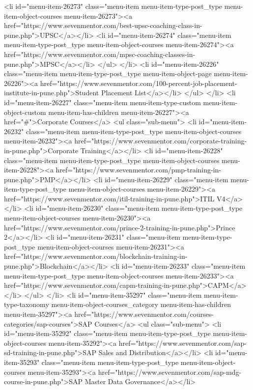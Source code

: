 {<li id="menu-item-26273" class="menu-item menu-item-type-post_type menu-item-object-courses menu-item-26273"><a href="https://www.sevenmentor.com/best-upsc-coaching-class-in-pune.php">UPSC</a></li>
<li id="menu-item-26274" class="menu-item menu-item-type-post_type menu-item-object-courses menu-item-26274"><a href="https://www.sevenmentor.com/mpsc-coaching-classes-in-pune.php">MPSC</a></li>
</ul>
</li>
<li id="menu-item-26226" class="menu-item menu-item-type-post_type menu-item-object-page menu-item-26226"><a href="https://www.sevenmentor.com/100-percent-job-placement-institute-in-pune.php">Student Placement List</a></li>
</ul>
</li>
<li id="menu-item-26227" class="menu-item menu-item-type-custom menu-item-object-custom menu-item-has-children menu-item-26227"><a href="#">Corporate Courses</a>
<ul class="sub-menu">
<li id="menu-item-26232" class="menu-item menu-item-type-post_type menu-item-object-courses menu-item-26232"><a href="https://www.sevenmentor.com/corporate-training-in-pune.php">Corporate Training</a></li>
<li id="menu-item-26228" class="menu-item menu-item-type-post_type menu-item-object-courses menu-item-26228"><a href="https://www.sevenmentor.com/pmp-training-in-pune.php">PMP</a></li>
<li id="menu-item-26229" class="menu-item menu-item-type-post_type menu-item-object-courses menu-item-26229"><a href="https://www.sevenmentor.com/itil-training-in-pune.php">ITIL V4</a></li>
<li id="menu-item-26230" class="menu-item menu-item-type-post_type menu-item-object-courses menu-item-26230"><a href="https://www.sevenmentor.com/prince-2-training-in-pune.php">Prince 2</a></li>
<li id="menu-item-26231" class="menu-item menu-item-type-post_type menu-item-object-courses menu-item-26231"><a href="https://www.sevenmentor.com/blockchain-training-in-pune.php">Blockchain</a></li>
<li id="menu-item-26233" class="menu-item menu-item-type-post_type menu-item-object-courses menu-item-26233"><a href="https://www.sevenmentor.com/capm-training-in-pune.php">CAPM</a></li>
</ul>
</li>
<li id="menu-item-35297" class="menu-item menu-item-type-taxonomy menu-item-object-courses_category menu-item-has-children menu-item-35297"><a href="https://www.sevenmentor.com/courses-categories/sap-courses">SAP Courses</a>
<ul class="sub-menu">
<li id="menu-item-35292" class="menu-item menu-item-type-post_type menu-item-object-courses menu-item-35292"><a href="https://www.sevenmentor.com/sap-sd-training-in-pune.php">SAP Sales and Distribution</a></li>
<li id="menu-item-35293" class="menu-item menu-item-type-post_type menu-item-object-courses menu-item-35293"><a href="https://www.sevenmentor.com/sap-mdg-course-in-pune.php">SAP Master Data Governance</a></li>
}
